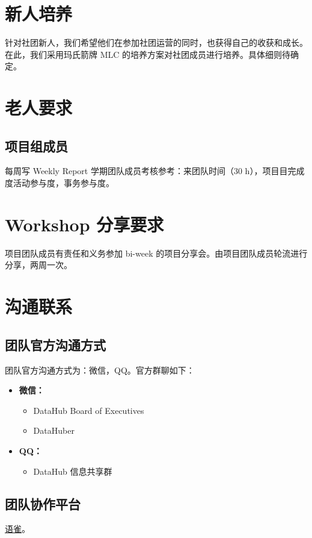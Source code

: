 \section{新人培养}
针对社团新人，我们希望他们在参加社团运营的同时，也获得自己的收获和成长。在此，我们采用玛氏箭牌 MLC 的培养方案对社团成员进行培养。具体细则待确定。



\section{老人要求}
    \subsection{项目组成员}
    每周写 Weekly Report 学期团队成员考核参考：来团队时间（30 h），项目目完成度活动参与度，事务参与度。



\section{Workshop 分享要求}
项目团队成员有责任和义务参加 bi-week 的项目分享会。由项目团队成员轮流进行分享，两周一次。



\section{沟通联系}
    \subsection{团队官方沟通方式}
    团队官方沟通方式为：微信，QQ。官方群聊如下：
    \begin{itemize}
        \item \textbf{微信：}
            \begin{itemize}
                \item DataHub Board of Executives
                \item DataHuber
            \end{itemize}
        \item \textbf{QQ：}
            \begin{itemize}
                \item DataHub 信息共享群
            \end{itemize}
    \end{itemize}


    \subsection{团队协作平台}
    \href{https://www.yuque.com/hllinu}{语雀}。



